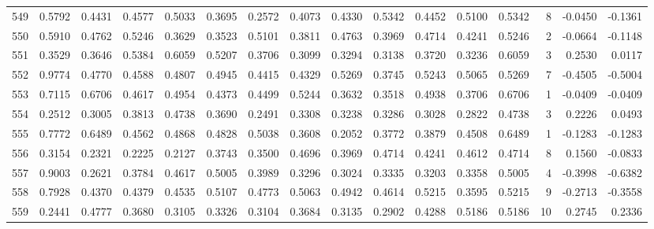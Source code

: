 \begin{tabular}{lrrrrrrrrrrrrrrr}
549 &      0.5792 &  0.4431 &  0.4577 &  0.5033 &  0.3695 &  0.2572 &  0.4073 &  0.4330 &  0.5342 &  0.4452 &   0.5100 &     0.5342 &      8 &                   -0.0450 &                    -0.1361 \\
550 &      0.5910 &  0.4762 &  0.5246 &  0.3629 &  0.3523 &  0.5101 &  0.3811 &  0.4763 &  0.3969 &  0.4714 &   0.4241 &     0.5246 &      2 &                   -0.0664 &                    -0.1148 \\
551 &      0.3529 &  0.3646 &  0.5384 &  0.6059 &  0.5207 &  0.3706 &  0.3099 &  0.3294 &  0.3138 &  0.3720 &   0.3236 &     0.6059 &      3 &                    0.2530 &                     0.0117 \\
552 &      0.9774 &  0.4770 &  0.4588 &  0.4807 &  0.4945 &  0.4415 &  0.4329 &  0.5269 &  0.3745 &  0.5243 &   0.5065 &     0.5269 &      7 &                   -0.4505 &                    -0.5004 \\
553 &      0.7115 &  0.6706 &  0.4617 &  0.4954 &  0.4373 &  0.4499 &  0.5244 &  0.3632 &  0.3518 &  0.4938 &   0.3706 &     0.6706 &      1 &                   -0.0409 &                    -0.0409 \\
554 &      0.2512 &  0.3005 &  0.3813 &  0.4738 &  0.3690 &  0.2491 &  0.3308 &  0.3238 &  0.3286 &  0.3028 &   0.2822 &     0.4738 &      3 &                    0.2226 &                     0.0493 \\
555 &      0.7772 &  0.6489 &  0.4562 &  0.4868 &  0.4828 &  0.5038 &  0.3608 &  0.2052 &  0.3772 &  0.3879 &   0.4508 &     0.6489 &      1 &                   -0.1283 &                    -0.1283 \\
556 &      0.3154 &  0.2321 &  0.2225 &  0.2127 &  0.3743 &  0.3500 &  0.4696 &  0.3969 &  0.4714 &  0.4241 &   0.4612 &     0.4714 &      8 &                    0.1560 &                    -0.0833 \\
557 &      0.9003 &  0.2621 &  0.3784 &  0.4617 &  0.5005 &  0.3989 &  0.3296 &  0.3024 &  0.3335 &  0.3203 &   0.3358 &     0.5005 &      4 &                   -0.3998 &                    -0.6382 \\
558 &      0.7928 &  0.4370 &  0.4379 &  0.4535 &  0.5107 &  0.4773 &  0.5063 &  0.4942 &  0.4614 &  0.5215 &   0.3595 &     0.5215 &      9 &                   -0.2713 &                    -0.3558 \\
559 &      0.2441 &  0.4777 &  0.3680 &  0.3105 &  0.3326 &  0.3104 &  0.3684 &  0.3135 &  0.2902 &  0.4288 &   0.5186 &     0.5186 &     10 &                    0.2745 &                     0.2336 \\

\end{tabular}
